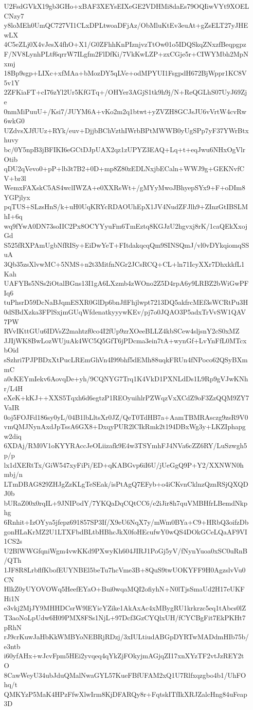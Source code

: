 U2FsdGVkX19gb3GHo+xBAF3XEYsEIXeGE2VDHMi8daEs79OQIiwVYt9XOELCNzy7
y8loMEh0UmQC727VI1CLxDPLtwoaDFjAz/ObMluKtEv3euAt+gZsELT27yJHEwLX
4C5eZLj0X4vJesX4fhO+X1/G0ZFhhKnPIznjvzTtOw01o5IDQSkqZNxzfBeqpgpz
F/NV8LynhPLtf6qrrW7ILgfm2FlDfKi/7VkKwLZP+zxCGje5r+CIWYMbh2MpNxmj
18Bp9sgp+LIXc+xfMAa+bMozDY5qLVe+odMPYUI1FsgpdH672BjWppr1KC8V5v1Y
2ZFKiaFT+cI76zYl2Ur5KfGTq+/OHYer3AGjS1tk9h9j/N+ReQGLhS07UyJ69Zje
0nmMiPuuU+/Ksi7/JUYM6A+vKo2m2q1btwt+yZVZH8GCJsJU6vVrtW4cvRw6wkG0
UZdvsXJfUUz+RYk/euv+DjjbBChVzthIWrbBPtMWWB0yUgSPp7yF37YWrBtxhuvy
bc/0Y5npB3jBFIKI6eGCtDJpUAX2qz1zUPYZ3EAQ+Lq+t+eqJwu6NHxOgVlrOtib
qDU2qVevo0+pP+lb3t7B2+0D+mp8Z80zEDLNxjbECaln+WWJ9g+GEKNvfCV+br3l
WemxFAXskC5AS4wclIWZA+e0XXRsWt+/gMYyMwoJBhyepSYx9+F+oDIm8YGPjlyx
pqTUS+SLzsHnS/k+uH0UqKRYcRDAOUhEpX1JV4NudZFJlh9+ZInzGtIBSLMhI+6q
wq9fYwA0DN73soIIC2Px8OCYYyuFm6TmEztq8KGJzU2hgvxj8rK/1caQEkXxojGd
S525fRXPAmUgbNfRISy+EiDwYeT+FItdakqcqQm9SINSQmJ/vl0vDYkqiomqSSuA
3Qb35zsXlvwMC+5NMS+n2t3MitfnNGr2JCsRCQ+CL+ln71IcyXXr7DhxkkfL1Kah
UAFYBs5NSs2iOtalBGns13I1gA6LXzmb4zWOno2Z5D4rpA6y9LRBZ2bWiGwPFIq6
tuPhsrD59DcNaBJqmESXR0GlDp6bnJflFhjlwpt7213DQ5akfrcMEf3sWCRtPu3H
0dSBdXzka3FPlSxjmGUqWfdenatkyyywKEv/pj7o0JQAO3P5adxTrVvSW1QAV7PW
RVvIKttGUu6IDVsZ2mahtzf0co4I2fUp9zrXOeeBLLZ4kbSCew4sljsnY2cS0xMZ
JJIjWK8BwLozWUjuAk4WC5Q5GfT6jPDcma3ein7tA+wynGf+LvYnFfL0MTcxbOid
sSzhri7PJPBDxXtPucLREmGhVn4I99bhf5dEMh88uqkFRUn4fNPoco62QSyBXmmC
a0cKEYmIekv6AovqDe+yh/9CQNYG7Trq1K4VkD1PXNLdDs1L9Rp9gVJwKNhr/L4H
eXeK+kKJ++XXS5Tqxh6d6egtzP1REOyuihlrPZWqzVxXCdZ9oF3ZzQQM9ZY7VaIR
0oj5FOJFd186sy0yL/04B1lbLltsXr0JZ/QeT0TdHB7a+AamTBMRAsczg9zsR9V0
vmQMJNynAxdJpTssA6GX8+DxqyPUR2lCIkRmk2t194DBxWg3y+LKZIphapgw2diq
6XDAj/RM0V1oKYYRAccJeOLiizafk9E4w3TSYmhFJ4NVa6cZZ6RY/LuSzwgh5p/p
lx1dXERtTx/GiW547xyFiPi/ED+qKABGvp6iI6U/jUeGgQ9P+Y2/XXNWN0hmbj/n
LTmDBAG829ZHJgZzKLgTeSEak/isPtAgQ7EFyb+o4iCKvnCklnzQznRSjQXQDJ0b
bURaZ00x0rqIL+9JNIPodY/7YKQaDqCQtCC6/e2iJir8h7quVMBHfrLBemdNkphg
6Rnhit+IzOYya5jfepz691857SP3If/X9eU6NqX7y/mWm0BYa+C9+HRbQ3oifzDb
gonHLaKrMZ2U1LTXFbdBLtbHBhcJkX0foHEcufwY0wQS4DOkGCeLQaAF9VI1CS2s
U2BlWWGfqniWgm4vwKKd9PXwyKh604JIRJ1PoGj5yV/fNynYuoa0xSC0uRnB/QTh
1JF8R8LrbflfKbofEUYNBEl5beTu7hcVme3B+8QuS9twUOKYFF9H0AgzslvVu0CN
HlkZ0yUYOVOWq5HeefEYaO+Bui0wqaMQI2ofiyhN+N0lTjsSmaUd2H17eUKFHi1N
e3vkj2MjJY9MHHDCsrW9lEYicYZike1AkAxAc4xMBygRU1krkrzc5eq1tAbcs0lZ
T3aoNoLpUdw6H09PMX8FSs1NjL+97Dcf3GzCYQlxUH/fCYCBgFit7EkPKHt7pRhN
rJ9crKuwJaHbKkWMBYoNEBRjRDzj/3xIULtiudABGpDYRTwMADdmHIb75b/e3ntb
i60yfAHx+wJcvFpm5HEi2yvqeq4qYkZjFOkyjmAGjqZI17xnXYzTF2vtJzREY2tO
8CawWeyU34ubJduQMalNwaGYL57KueFBfUFAM2xQ1U7Rlfxqzgbo4b1/UhFOhq/t
QMKYzP5MaK4HPzFfwXlwIrm8KjDFARQy8r+FqtskITfIkXRJZalcHng84uFeap3D

